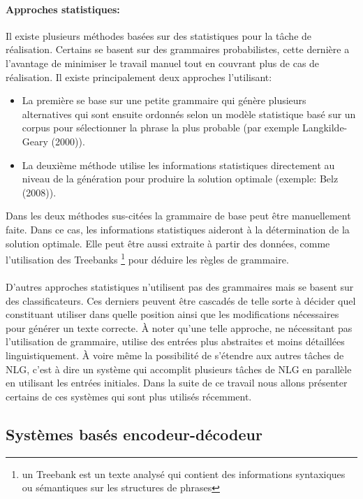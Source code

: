 \paragraph{Approches statistiques:} Il existe plusieurs méthodes basées sur des statistiques pour la tâche de réalisation. Certains se basent sur des grammaires probabilistes, cette dernière a l’avantage de minimiser le travail manuel tout en couvrant plus de cas de réalisation. Il existe principalement deux approches l’utilisant\cite{Gatt2018}:
\begin{itemize}
	\item La première se base sur une petite grammaire qui génère plusieurs alternatives qui sont ensuite ordonnés selon un modèle statistique basé sur un corpus pour sélectionner la phrase la plus probable (par exemple Langkilde-Geary (2000)\cite{LangkildeGeary2000}).
	\item La deuxième méthode utilise les informations statistiques directement au niveau de la génération pour produire la solution optimale (exemple: Belz (2008)\cite{Belz2008}).
\end{itemize}
	Dans les deux méthodes sus-citées la grammaire de base peut être manuellement faite. Dans ce cas, les informations statistiques aideront à la détermination de la solution optimale. Elle peut être aussi extraite à partir des données, comme l’utilisation des Treebanks \footnote{un Treebank est un texte analysé qui contient des informations syntaxiques ou sémantiques sur les structures de phrases} pour déduire les règles de grammaire\cite{Espinosa2008}.\newline
\paragraph{}
D’autres approches statistiques n’utilisent pas des grammaires mais se basent sur des classificateurs. Ces derniers peuvent être cascadés de telle sorte à décider quel constituant utiliser dans quelle position ainsi que les modifications nécessaires pour générer un texte correcte. À noter qu’une telle approche, ne nécessitant pas l’utilisation de grammaire, utilise des entrées plus abstraites et moins détaillées linguistiquement. À voire même la possibilité de s’étendre aux autres tâches de NLG, c’est à dire un système qui accomplit plusieurs tâches de NLG en parallèle en utilisant les entrées initiales. Dans la suite de ce travail nous allons présenter certains de ces systèmes qui sont plus utilisés récemment.

\subsection{Systèmes basés encodeur-décodeur}
